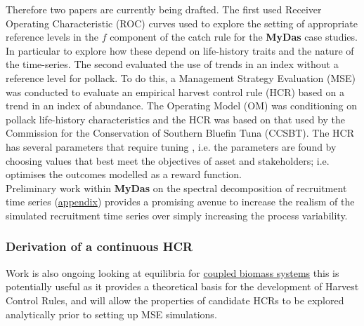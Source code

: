 Therefore two papers are currently being drafted. The first used Receiver Operating Characteristic (ROC) curves used to explore the setting of appropriate reference levels in the $f$ component of the catch rule for the \textbf{MyDas} case studies. In particular to explore how these depend on life-history traits and the nature of the time-series. The second evaluated the use of trends in an index without a reference level for pollack. To do this, a Management Strategy Evaluation (MSE) was conducted to evaluate an empirical harvest control rule (HCR) based on a trend in an index of
abundance. The Operating Model (OM) was conditioning on pollack life-history characteristics and the HCR was based on that used by the Commission for the Conservation of Southern Bluefin Tuna (CCSBT). The HCR has several parameters that require tuning \citep{hillary2015scientific}, i.e. the parameters are found by choosing values that best meet the objectives of asset and stakeholders; i.e. optimises the outcomes modelled as a reward function.\\
Preliminary work within {\bf{MyDas}} on the spectral decomposition of recruitment time series (\hyperref[appendix:spectral]{appendix}) provides a promising avenue to increase the realism of the simulated recruitment time series over simply increasing the process variability. 

\subsubsection*{Derivation of a continuous HCR}
Work is also ongoing looking at equilibria for \href{https://drive.google.com/open?id=1ldTJfrVxNsIHD9s9W0jyNaeedLZqDIPS}{coupled biomass systems} this is potentially useful as it provides a theoretical basis for the development of Harvest Control Rules, and will allow the properties of candidate HCRs to be explored analytically prior to setting up MSE simulations.


